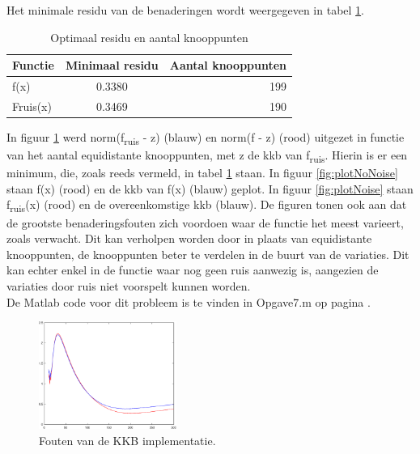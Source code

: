 \documentclass[a4paper]{article}
\begin{document}
Het minimale residu van de benaderingen wordt weergegeven in tabel \ref{tab:splineError}.
\begin{table}[H]
	\centering
	\begin{tabular}{l c r}
		Functie & Minimaal residu & Aantal knooppunten \\ \hline
		f(x) & 0.3380 & 199 \\
		Fruis(x) & 0.3469 & 190 \\
	\end{tabular}
	\caption{Optimaal residu en aantal knooppunten}
	\label{tab:splineError}
\end{table}

In figuur \ref{fig:errorkkb} werd norm(f\textsubscript{ruis} - z) (blauw) en norm(f - z) (rood) uitgezet in functie van het aantal equidistante knooppunten, met z de kkb van f\textsubscript{ruis}. Hierin is er een minimum, die, zoals reeds vermeld, in tabel \ref{tab:splineError} staan. In figuur \ref{fig:plotNoNoise} staan f(x) (rood) en de kkb van f(x) (blauw) geplot. In figuur \ref{fig:plotNoise} staan f\textsubscript{ruis}(x) (rood) en de overeenkomstige kkb (blauw). De figuren tonen ook aan dat de grootste benaderingsfouten zich voordoen waar de functie het meest varieert, zoals verwacht. Dit kan verholpen worden door in plaats van equidistante knooppunten, de knooppunten beter te verdelen in de buurt van de variaties. Dit kan echter enkel in de functie waar nog geen ruis aanwezig is, aangezien de variaties door ruis niet voorspelt kunnen worden. \\

De Matlab code voor dit probleem is te vinden in Opgave7.m op pagina \pageref{sec:code7}.

\begin{figure}[H]
	\begin{center} 
		\includegraphics[width=0.4\textwidth]{ErrorBSplines.eps}
	\end{center}
	\caption{Fouten van de KKB implementatie.}
	\label{fig:errorkkb}
\end{figure}
\end{document}

